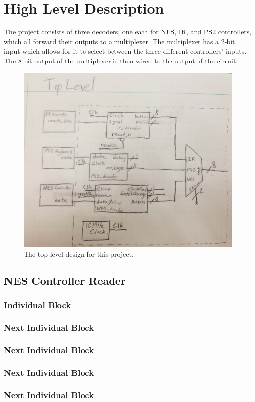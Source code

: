 \documentclass[a4paper]{article}
\begin{document}
\newpage
\section{High Level Description}

The project consists of three decoders, one each for NES, IR, and PS2 controllers, which all forward their outputs to a multiplexer. The multiplexer has a 2-bit input which allows for it to select between the three different controllers' inputs. The 8-bit output of the multiplexer is then wired to the output of the circuit. 

\begin{figure}[ht]
  \centering
    \includegraphics[width=.5\textwidth]{images/block_diagrams/top_level.png}
	\caption{The top level design for this project.}
    \label{fig:top_level}
\end{figure}


\subsection{NES Controller Reader}
\subsubsection{Individual Block}
\subsubsection{Next Individual Block}
\subsubsection{Next Individual Block}
\subsubsection{Next Individual Block}
\subsubsection{Next Individual Block}
\end{document}
